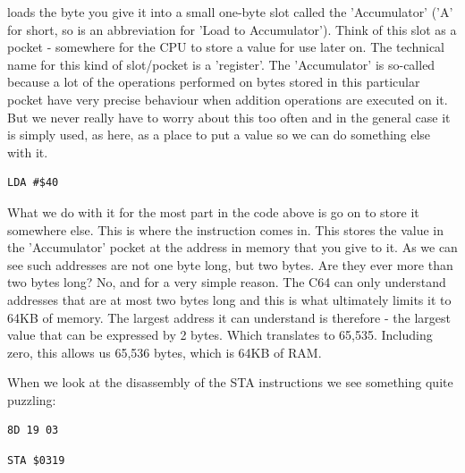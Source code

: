  loads the byte you give it into a small one-byte slot called the 'Accumulator' ('A' for short,
so  is an abbreviation for 'Load to Accumulator'). Think of this slot
as a pocket - somewhere for the CPU to store a value for use later on. The technical name for this kind of 
slot/pocket is a 'register'. The 'Accumulator' is so-called because a lot of the operations performed on
bytes stored in this particular pocket have very precise behaviour when addition operations are executed on
it. But we never really have to worry about this too often and in the general case it is simply used, as
here, as a place to put a value so we can do something else with it.
\clearpage

\begin{lstlisting}[caption=Loading the byte \$40 to the \icode{Accumulator}.,escapechar=\%]
LDA #$40
\end{lstlisting}

What we do with it for the most part in the code above is go on to store it somewhere else. This is where
the  instruction comes in. This stores the value in the 'Accumulator' pocket at the address
in memory that you give to it. As we can see such addresses are not one byte long, but two bytes. Are they
ever more than two bytes long? No, and for a very simple reason. The C64 can only understand addresses
that are at most two bytes long and this is what ultimately limits it to 64KB of memory. The largest address it can understand
is therefore  - the largest value that can be expressed by 2 bytes. Which translates to 65,535.
Including zero, this allows us 65,536 bytes, which is 64KB of RAM. 

When we look at the disassembly of the STA instructions we see something quite puzzling:

\begin{minipage}[b]{0.45\linewidth}
\centering
\begin{lstlisting}[escapechar=\%]
8D 19 03
\end{lstlisting}
\end{minipage}
\hspace{0.5cm}
\begin{minipage}[b]{0.45\linewidth}
\centering
\begin{lstlisting}[escapechar=\%]
STA $0319
\end{lstlisting}
\end{minipage}

